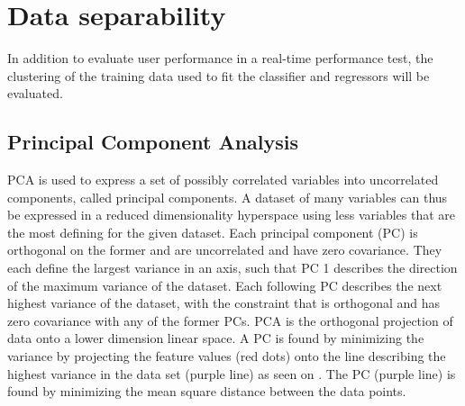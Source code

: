 \section{Data separability}
In addition to evaluate user performance in a real-time performance test, the clustering of the training data used to fit the classifier and regressors will be evaluated. 


\subsection{Principal Component Analysis}
PCA is used to express a set of possibly correlated variables into uncorrelated components, called principal components. A dataset of many variables can thus be expressed in a reduced dimensionality hyperspace using less variables that are the most defining for the given dataset. Each principal component (PC) is orthogonal on the former and are uncorrelated and have zero covariance. They each define the largest variance in an axis, such that PC 1 describes the direction of the maximum variance of the dataset. Each following PC describes the next highest variance of the dataset, with the constraint that is orthogonal and has zero covariance with any of the former PCs.
PCA is the orthogonal projection of data onto a lower dimension linear space. A PC is found by minimizing the variance by projecting the feature values (red dots) onto the line describing the highest variance in the data set (purple line) as seen on . The PC (purple line) is found by minimizing the mean square distance between the data points. 

